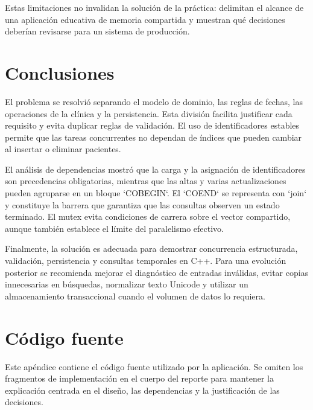 \documentclass[12pt,letterpaper]{article}
\begin{document}
Estas limitaciones no invalidan la solución de la práctica: delimitan el
alcance de una aplicación educativa de memoria compartida y muestran qué
decisiones deberían revisarse para un sistema de producción.

\section{Conclusiones}

El problema se resolvió separando el modelo de dominio, las reglas de fechas,
las operaciones de la clínica y la persistencia. Esta división facilita
justificar cada requisito y evita duplicar reglas de validación. El uso de
identificadores estables permite que las tareas concurrentes no dependan de
índices que pueden cambiar al insertar o eliminar pacientes.

El análisis de dependencias mostró que la carga y la asignación de
identificadores son precedencias obligatorias, mientras que las altas y varias
actualizaciones pueden agruparse en un bloque `COBEGIN`. El `COEND` se
representa con `join` y constituye la barrera que garantiza que las consultas
observen un estado terminado. El mutex evita condiciones de carrera sobre el
vector compartido, aunque también establece el límite del paralelismo efectivo.

Finalmente, la solución es adecuada para demostrar concurrencia estructurada,
validación, persistencia y consultas temporales en C++. Para una evolución
posterior se recomienda mejorar el diagnóstico de entradas inválidas, evitar
copias innecesarias en búsquedas, normalizar texto Unicode y utilizar un
almacenamiento transaccional cuando el volumen de datos lo requiera.

\clearpage
{}
\renewcommand{\refname}{Referencias}



\appendix
\section{Código fuente}
\label{app:codigo}

Este apéndice contiene el código fuente utilizado por la aplicación. Se omiten
los fragmentos de implementación en el cuerpo del reporte para mantener la
explicación centrada en el diseño, las dependencias y la justificación de las
decisiones.
\end{document}

